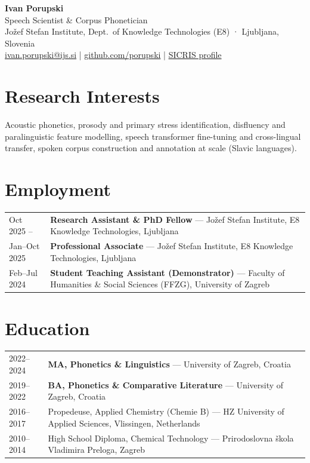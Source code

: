 \documentclass[10pt, a4paper]{article}
\newcommand{\entry}[2]{#1 & #2 \\[2pt]}
\begin{document}
\begin{center}
  {\LARGE\bfseries Ivan Porupski}\\[5pt]
  {\normalsize Speech Scientist \& Corpus Phonetician}\\[3pt]
  {\small
    Jožef Stefan Institute, Dept.\ of Knowledge Technologies (E8) · Ljubljana, Slovenia\\[2pt]
    \href{mailto:ivan.porupski@ijs.si}{ivan.porupski@ijs.si} \quad|\quad
    \href{https://github.com/porupski}{github.com/porupski} \quad|\quad
    \href{https://sicris.izum.si/public/rsr.aspx?lang=eng&id=60262}{SICRIS profile}
  }
\end{center}

\vspace{4pt}

\section{Research Interests}
Acoustic phonetics, prosody and primary stress identification, disfluency and paralinguistic
feature modelling, speech transformer fine-tuning and cross-lingual transfer, spoken corpus
construction and annotation at scale (Slavic languages).

\section{Employment}
\begin{tabular}{@{} P{3cm} P{13cm} @{}}
  \entry{Oct 2025 –}
        {\textbf{Research Assistant \& PhD Fellow} — Jožef Stefan Institute, E8 Knowledge Technologies, Ljubljana}
  \entry{Jan–Oct 2025}
        {\textbf{Professional Associate} — Jožef Stefan Institute, E8 Knowledge Technologies, Ljubljana}
  \entry{Feb–Jul 2024}
        {\textbf{Student Teaching Assistant (Demonstrator)} — Faculty of Humanities \& Social
         Sciences (FFZG), University of Zagreb}
\end{tabular}

\section{Education}
\begin{tabular}{@{} P{3cm} P{13cm} @{}}
  \entry{2022–2024}
        {\textbf{MA, Phonetics \& Linguistics} — University of Zagreb, Croatia}
  \entry{2019–2022}
        {\textbf{BA, Phonetics \& Comparative Literature} — University of Zagreb, Croatia}
  \entry{2016–2017}
        {Propedeuse, Applied Chemistry (Chemie B) — HZ University of Applied Sciences,
         Vlissingen, Netherlands}
  \entry{2010–2014}
        {High School Diploma, Chemical Technology — Prirodoslovna škola Vladimira Preloga,
         Zagreb}
\end{tabular}
\end{document}
